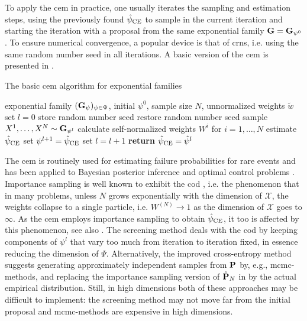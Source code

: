 To apply the \acrshort{cem} in practice, one usually iterates the sampling and estimation steps, using the previously found $\hpce$ to sample in the current iteration and starting the iteration with a proposal from the same exponential family $\G = \G_{\psi^{0}}$. To ensure numerical convergence, a popular device is that of \glspl{crn}, i.e. using the same random number seed in all iterations. A basic version of the \acrshort{cem} is presented in .

\begin{algorithm}
    \caption{The basic \gls{cem} algorithm for exponential families}
    \label{alg:cem-basic}
    \begin{algorithmic}
        \Require exponential family $(\G_{\psi})_{\psi \in\Psi}$, initial $\psi^{0}$, sample size $N$, unnormalized weights $\tilde w$
        \State set $l = 0$
        \State store random number seed
        \Repeat
            \State restore random number seed
            \State sample $X^{1}, \dots, X^{N} \sim \G_{\psi^{l}}$
            \State calculate self-normalized weights $W^{i}$ for $i = 1, \dots, N$ 
            \State estimate $\hpce$ 
            \State set $\psi^{l + 1} = \hpce$
            \State set $l = l + 1$
        \State \textbf{return} $\hpce = \hat\psi^{l}$
    \end{algorithmic}
\end{algorithm}

The \gls{cem} is routinely used for estimating failure probabilities for rare events \citep{Homem-de-Mello2007Study} and has been applied to Bayesian posterior inference \citep{Engel2023Bayesian,Ehre2023Certified} and optimal control problems \citep{Kappen2016Adaptive,Zhang2014Applications}.
Importance sampling is well known to exhibit the \gls{cod} \cite{Bengtsson2008Curseofdimensionality}, i.e. the phenomenon that in many problems, unless $N$ grows exponentially with the dimension of $\mathcal X$, the weights collapse to a single particle, i.e. $W^{(N)} \to 1$ as the dimension of $\mathcal X$ goes to $\infty$. As the \acrshort{cem} employs importance sampling to obtain $\hpce$, it too is affected by this phenomenon, see also . 
The screening method \cite{Rubinstein2009How} deals with the \acrshort{cod} by keeping components of $\psi^{l}$ that vary too much from iteration to iteration fixed, in essence reducing the dimension of $\Psi$. 
Alternatively, the improved cross-entropy method \citep{Chan2012Improved} suggests generating approximately independent samples from $\P$ by, e.g., \acrshort{mcmc}-methods, and replacing the importance sampling version of $\hat\P_{N}$  in  by the actual empirical distribution.
Still, in high dimensions both of these approaches may be difficult to implement: the screening method may not move far from the initial proposal and \acrshort{mcmc}-methods are expensive in high dimensions.

